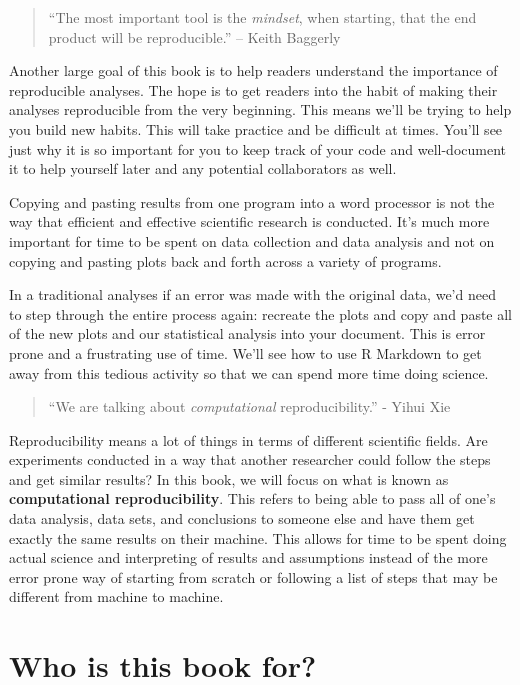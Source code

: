 \documentclass[]{tufte-book}
\begin{document}
\begin{quote}
``The most important tool is the \emph{mindset}, when starting, that the
end product will be reproducible.'' -- Keith Baggerly
\end{quote}

Another large goal of this book is to help readers understand the
importance of reproducible analyses. The hope is to get readers into the
habit of making their analyses reproducible from the very beginning.
This means we'll be trying to help you build new habits. This will take
practice and be difficult at times. You'll see just why it is so
important for you to keep track of your code and well-document it to
help yourself later and any potential collaborators as well.

Copying and pasting results from one program into a word processor is
not the way that efficient and effective scientific research is
conducted. It's much more important for time to be spent on data
collection and data analysis and not on copying and pasting plots back
and forth across a variety of programs.

In a traditional analyses if an error was made with the original data,
we'd need to step through the entire process again: recreate the plots
and copy and paste all of the new plots and our statistical analysis
into your document. This is error prone and a frustrating use of time.
We'll see how to use R Markdown to get away from this tedious activity
so that we can spend more time doing science.

\begin{quote}
``We are talking about \emph{computational} reproducibility.'' - Yihui
Xie
\end{quote}

Reproducibility means a lot of things in terms of different scientific
fields. Are experiments conducted in a way that another researcher could
follow the steps and get similar results? In this book, we will focus on
what is known as \textbf{computational reproducibility}. This refers to
being able to pass all of one's data analysis, data sets, and
conclusions to someone else and have them get exactly the same results
on their machine. This allows for time to be spent doing actual science
and interpreting of results and assumptions instead of the more error
prone way of starting from scratch or following a list of steps that may
be different from machine to machine.

\section{Who is this book for?}\label{who-is-this-book-for}
\end{document}
